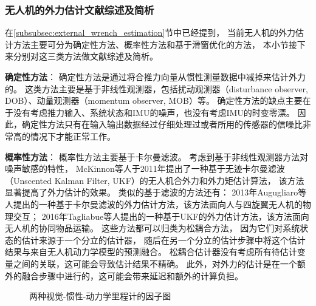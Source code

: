 \subsubsection{无人机的外力估计文献综述及简析}
在\ref{subsubsec:external_wrench_estimation}节中已经提到，
当前无人机的外力估计方法主要可分为确定性方法、概率性方法和基于滑窗优化的方法，
本小节接下来分别对这三类方法做文献综述及简析。

\textbf{确定性方法}：
确定性方法是通过将合推力向量从惯性测量数据中减掉来估计外力的\cite{tomic2014unified}。
这类方法主要是基于非线性观测器，包括扰动观测器（disturbance observer, DOB）\cite{liang2023active, yuksel2014nonlinear}、动量观测器（momentum observer, MOB）\cite{bodie2019omnidirectional,nigro2021control, tomic2016flying,ruggiero2014impedance}等。
确定性方法的缺点主要在于没有考虑推力输入、系统状态和IMU的噪声，也没有考虑IMU的时变零漂。
因此，确定性方法只有在输入输出数据经过仔细处理过或者所用的传感器的信噪比非常高的情况下才能正常工作。

\textbf{概率性方法}：
概率性方法主要基于卡尔曼滤波。
考虑到基于非线性观测器方法对噪声敏感的特性，
McKinnon等人于2011年提出了一种基于无迹卡尔曼滤波（Unscented Kalman Filter, UKF）的无人机合外力和外力矩估计算法\cite{mckinnon2016unscented}，
该方法显著提高了外力估计的效果。
类似的基于滤波的方法还有：
2013年Augugliaro等人提出的一种基于卡尔曼滤波的外力估计方法\cite{augugliaro2013admittance}，该方法面向人与四旋翼无人机的物理交互；
2016年Tagliabue等人提出的一种基于UKF的外力估计方法\cite{tagliabue2016collaborative}，该方法面向无人机的协同物品运输。
这些方法都可以归类为松耦合方法，
因为它们对系统状态的估计来源于一个分立的估计器，
随后在另一个分立的估计步骤中将这个估计结果与来自无人机动力学模型的预测融合。
松耦合估计器没有考虑所有待估计变量之间的关联，这可能会导致估计结果不精确。
此外，对外力的估计是在一个额外的融合步骤中进行的，这可能会带来延迟和额外的计算负担\cite{nisar2019vimo}。

\begin{figure}[!ht]
    \setlength{\subfigcapskip}{-1bp}
    \centering
    \begin{minipage}{\textwidth}

    \centering
    \subfigure{\label{subfig:vimo_factor_graph}}\addtocounter{subfigure}{-2}
    \subfigure{\label{subfig:vid_fusion_factor_graph}}\addtocounter{subfigure}{-2}

    \end{minipage}
    \caption{两种视觉-惯性-动力学里程计的因子图}
    \label{fig:common_sensors_for_slam}
\end{figure}

